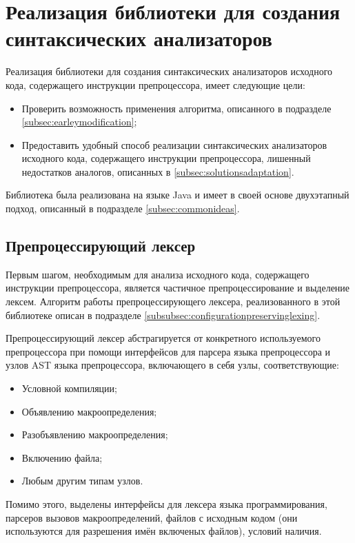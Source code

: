 \clearpage

\section{Реализация библиотеки для создания синтаксических анализаторов}

Реализация библиотеки для создания синтаксических анализаторов исходного кода, содержащего инструкции препроцессора, имеет следующие цели:

\begin{itemize}
\item Проверить возможность применения алгоритма, описанного в подразделе \ref{subsec:earleymodification};
\item Предоставить удобный способ реализации синтаксических анализаторов исходного кода, содержащего инструкции препроцессора, лишенный недостатков аналогов, описанных в \ref{subsec:solutionsadaptation}.
\end{itemize}

Библиотека была реализована на языке Java и имеет в своей основе двухэтапный подход, описанный в подразделе \ref{subsec:commonideas}. 

\subsection{Препроцессирующий лексер}

Первым шагом, необходимым для анализа исходного кода, содержащего инструкции препроцессора, является частичное препроцессирование и выделение лексем. Алгоритм работы препроцессирующего лексера, реализованного в этой библиотеке описан в подразделе \ref{subsubsec:configurationpreservinglexing}.

Препроцессирующий лексер абстрагируется от конкретного используемого препроцессора при помощи интерфейсов для парсера языка препроцессора и узлов AST языка препроцессора, включающего в себя узлы, соответствующие:

\begin{itemize}
\item Условной компиляции;
\item Объявлению макроопределения;
\item Разобъявлению макроопределения;
\item Включению файла;
\item Любым другим типам узлов.
\end{itemize}

Помимо этого, выделены интерфейсы для лексера языка программирования, парсеров вызовов макроопределений, файлов с исходным кодом (они используются для разрешения имён включеных файлов), условий наличия.

